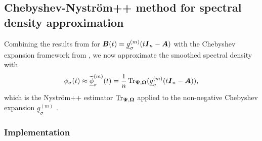 \subsection{Chebyshev-Nyström++ method for spectral density approximation}
\label{subsec:chebyshev-nystrom}

Combining the results from  for $\boldsymbol{B}(t) = \underline{g}_{\sigma}^{(m)}(t \boldsymbol{I}_n - \boldsymbol{A})$ with the Chebyshev expansion framework from , we now approximate the smoothed spectral density with
\begin{equation}
    \phi_{\sigma}(t) \approx \widetilde{\underline{\phi}}_{\sigma}^{(m)}(t) = \frac{1}{n} \operatorname{Tr}_{\boldsymbol{\Psi}, \boldsymbol{\Omega}}(\underline{g}_{\sigma}^{(m)}(t \boldsymbol{I}_n - \boldsymbol{A})),
    \label{equ:chebyshev-nystrom-formula}
\end{equation}
which is the Nyström++ estimator $\operatorname{Tr}_{\boldsymbol{\Psi}, \boldsymbol{\Omega}}$  applied to the non-negative Chebyshev expansion $\underline{g}_{\sigma}^{(m)}$ .


\subsubsection{Implementation}
\label{subsubsec:chebyshev-nystrom-implementation}


